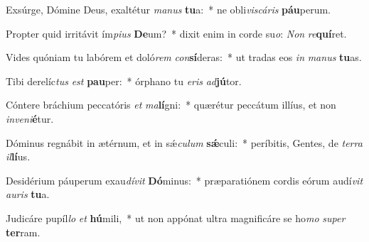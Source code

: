 \item Exsúrge, Dómine Deus, exaltétur \textit{ma}\textit{nus} \textbf{tu}a:~* ne obli\textit{vis}\textit{cá}\textit{ris} \textbf{páu}perum.
\item Propter quid irritávit ím\textit{pi}\textit{us} \textbf{De}um?~* dixit enim in corde su\textit{o}: \textit{Non} \textit{re}\textbf{quí}ret.
\item Vides quóniam tu labórem et doló\textit{rem} \textit{con}\textbf{sí}deras:~* ut tradas eos \textit{in} \textit{ma}\textit{nus} \textbf{tu}as.
\item Tibi derelíc\textit{tus} \textit{est} \textbf{pau}per:~* órphano tu \textit{e}\textit{ris} \textit{ad}\textbf{jú}tor.
\item Cóntere bráchium peccatóris \textit{et} \textit{ma}\textbf{lí}gni:~* quærétur peccátum illíus, et non \textit{in}\textit{ve}\textit{ni}\textbf{é}tur.
\item Dóminus regnábit in ætérnum, et in sǽ\textit{cu}\textit{lum} \textbf{sǽ}culi:~* períbitis, Gentes, de \textit{ter}\textit{ra} \textit{il}\textbf{lí}us.
\item Desidérium páuperum exau\textit{dí}\textit{vit} \textbf{Dó}minus:~* præparatiónem cordis eórum audí\textit{vit} \textit{au}\textit{ris} \textbf{tu}a.
\item Judicáre pupíl\textit{lo} \textit{et} \textbf{hú}mili,~* ut non appónat ultra magnificáre se ho\textit{mo} \textit{su}\textit{per} \textbf{ter}ram.
